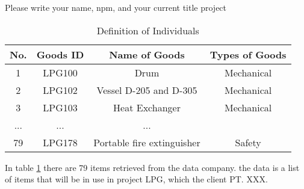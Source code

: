 Please write your name, npm, and your current title project

\begin{table}[h]
    \caption{Definition of Individuals}
    \centering
    \begin{tabular}{c c c c}
    \hline
    No. & Goods ID & Name of Goods & Types of Goods \\
    \hline
    1 & LPG100 & Drum & Mechanical \\
    2 & LPG102 & Vessel D-205 and D-305 & Mechanical \\
    3 & LPG103 & Heat Exchanger & Mechanical\\
    ... & ... & ... \\
    79 & LPG178 & Portable fire extinguisher & Safety \\
    \hline
    \end{tabular}
    \label{table}
\end{table}

\par In table \ref{table} there are 79 items retrieved from the data company. the data is a list of items that will be in use in project LPG, which the client PT. XXX. 
